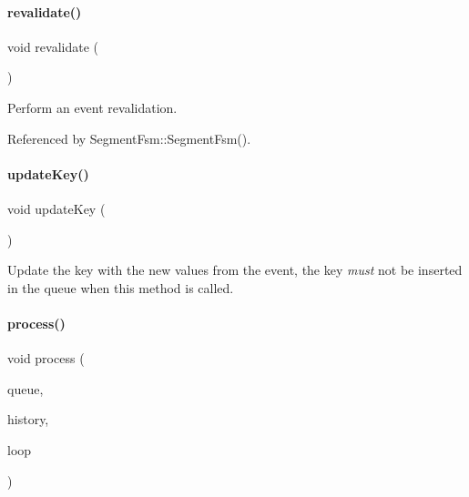 \mbox{\label{classKite_1_1RoutingEvent_a5bd93abe1416952ace15a98dbeeed124}} 
\paragraph{\texorpdfstring{revalidate()}{revalidate()}}
{\footnotesize\ttfamily void revalidate (\begin{DoxyParamCaption}{ }\end{DoxyParamCaption})}

Perform an event revalidation. 

Referenced by Segment\+Fsm\+::\+Segment\+Fsm().

\mbox{\label{classKite_1_1RoutingEvent_a14468bece068cbc5221f057226ee8955}} 
\paragraph{\texorpdfstring{update\+Key()}{updateKey()}}
{\footnotesize\ttfamily void update\+Key (\begin{DoxyParamCaption}{ }\end{DoxyParamCaption})\hspace{0.3cm}{\ttfamily [inline]}}

Update the key with the new values from the event, the key {\itshape must} not be inserted in the queue when this method is called. \mbox{\label{classKite_1_1RoutingEvent_a6add4f520081c698421481bf8fe0ad1f}} 
\paragraph{\texorpdfstring{process()}{process()}}
{\footnotesize\ttfamily void process (\begin{DoxyParamCaption}\item[{\hyperlink{classKite_1_1RoutingEventQueue}{Routing\+Event\+Queue} \&}]{queue,  }\item[{\hyperlink{classKite_1_1RoutingEventHistory}{Routing\+Event\+History} \&}]{history,  }\item[{\hyperlink{classKite_1_1RoutingEventLoop}{Routing\+Event\+Loop} \&}]{loop }\end{DoxyParamCaption})}


